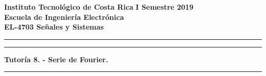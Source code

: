 
\onehalfspace
\noindent
\large\textbf{Instituto Tecnológico de Costa Rica} \hfill \textbf{I Semestre 2019} \\
\large\textbf{Escuela de Ingeniería Electrónica} \\
\large\textbf{EL-4703 Señales y Sistemas}

\noindent\rule[1mm]{\textwidth}{0.4pt}

\vspace{3mm}

\par\noindent\rule[-3mm]{\textwidth}{0.4pt}
\begin{center}
\Large\textbf{Tutoría 8. - Serie de Fourier.}
\end{center}
\par\noindent\rule[6mm]{\textwidth}{0.4pt}

\vspace{2mm}

\setlength\parskip{3mm}
